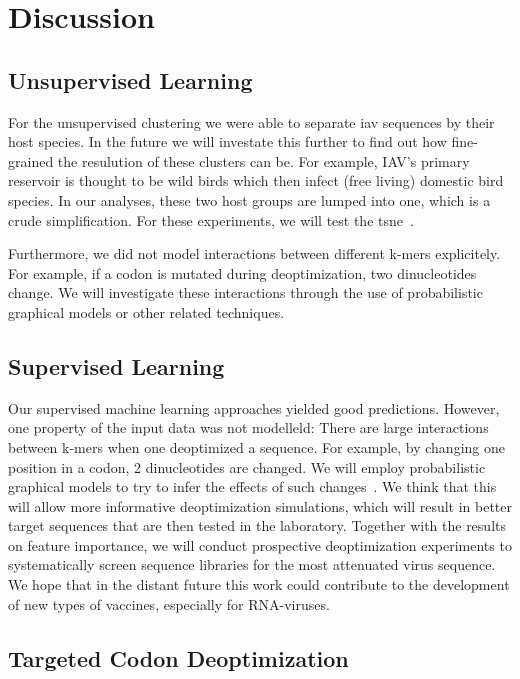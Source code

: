 \section{Discussion}


\subsection{Unsupervised Learning}

For the unsupervised clustering we were able to separate \gls{iav} sequences by their host species. In the future we will investate this further to find out how fine-grained the resulution of these clusters can be. For example, IAV's primary reservoir is thought to be wild birds which then infect (free living) domestic bird species. In our analyses, these two host groups are lumped into one, which is a crude simplification. For these experiments, we will test the \gls{tsne}~\cite{Maaten2008-we}.

Furthermore, we did not model interactions between different k-mers explicitely. For example, if a codon is mutated during deoptimization, two dinucleotides change. We will investigate these interactions through the use of probabilistic graphical models or other related techniques.


\subsection{Supervised Learning}

Our supervised machine learning approaches yielded good predictions. However, one property of the input data was not modelleld: There are large interactions between k-mers when one deoptimized a sequence. For example, by changing one position in a codon, 2 dinucleotides are changed. We will employ probabilistic graphical models to try to infer the effects of such changes~\cite{Tran2017-mc, Bishop2013-mq}. We think that this will allow more informative deoptimization simulations, which will result in better target sequences that are then tested in the laboratory. Together with the results on feature importance, we will conduct prospective deoptimization experiments to systematically screen sequence libraries for the most attenuated virus sequence. We hope that in the distant future this work could contribute to the development of new types of vaccines, especially for RNA-viruses.


\subsection{Targeted Codon Deoptimization}

